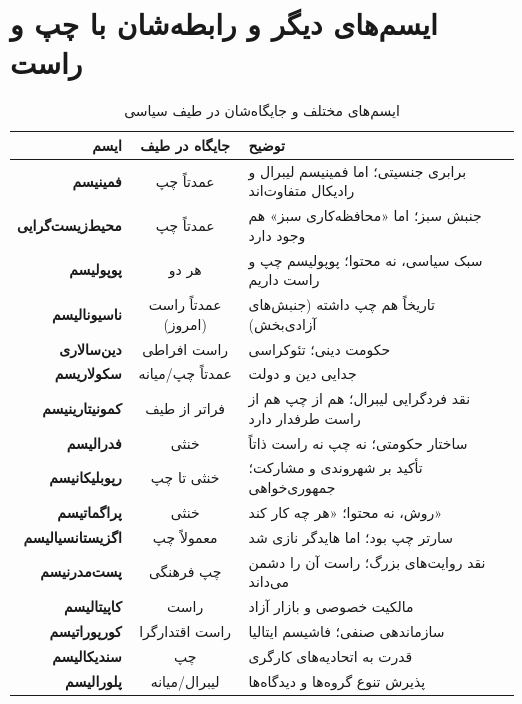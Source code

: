 \section*{ایسم‌های دیگر و رابطه‌شان با چپ و راست}

\begin{table}[H]
\centering
\small
\begin{tabular}{|>{\columncolor{darkgray!10}}r|c|p{7cm}|}
\hline
\rowcolor{darkgray!30}
\textbf{ایسم} & \textbf{جایگاه در طیف} & \textbf{توضیح} \\
\hline
\textbf{فمینیسم} & عمدتاً چپ & برابری جنسیتی؛ اما فمینیسم لیبرال و رادیکال متفاوت‌اند \\
\hline
\textbf{محیط‌زیست‌گرایی} & عمدتاً چپ & جنبش سبز؛ اما «محافظه‌کاری سبز» هم وجود دارد \\
\hline
\textbf{پوپولیسم} & هر دو & سبک سیاسی، نه محتوا؛ پوپولیسم چپ و راست داریم \\
\hline
\textbf{ناسیونالیسم} & عمدتاً راست (امروز) & تاریخاً هم چپ داشته (جنبش‌های آزادی‌بخش) \\
\hline
\textbf{دین‌سالاری} & راست افراطی & حکومت دینی؛ تئوکراسی \\
\hline
\textbf{سکولاریسم} & عمدتاً چپ/میانه & جدایی دین و دولت \\
\hline
\textbf{کمونیتارینیسم} & فراتر از طیف & نقد فردگرایی لیبرال؛ هم از چپ هم از راست طرفدار دارد \\
\hline
\textbf{فدرالیسم} & خنثی & ساختار حکومتی؛ نه چپ نه راست ذاتاً \\
\hline
\textbf{رپوبلیکانیسم} & خنثی تا چپ & تأکید بر شهروندی و مشارکت؛ جمهوری‌خواهی \\
\hline
\textbf{پراگماتیسم} & خنثی & روش، نه محتوا؛ «هر چه کار کند» \\
\hline
\textbf{اگزیستانسیالیسم} & معمولاً چپ & سارتر چپ بود؛ اما هایدگر نازی شد \\
\hline
\textbf{پست‌مدرنیسم} & چپ فرهنگی & نقد روایت‌های بزرگ؛ راست آن را دشمن می‌داند \\
\hline
\textbf{کاپیتالیسم} & راست & مالکیت خصوصی و بازار آزاد \\
\hline
\textbf{کورپوراتیسم} & راست اقتدارگرا & سازماندهی صنفی؛ فاشیسم ایتالیا \\
\hline
\textbf{سندیکالیسم} & چپ & قدرت به اتحادیه‌های کارگری \\
\hline
\textbf{پلورالیسم} & لیبرال/میانه & پذیرش تنوع گروه‌ها و دیدگاه‌ها \\
\hline
\end{tabular}
\caption{ایسم‌های مختلف و جایگاه‌شان در طیف سیاسی}
\end{table}

